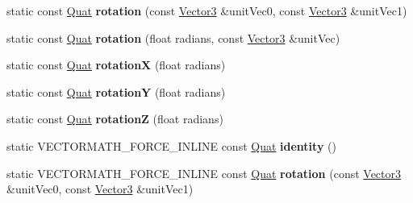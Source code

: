 \begin{DoxyCompactItemize}
\mbox{\label{classVectormath_1_1Aos_1_1Quat_ad4d8db2b4c7f290e92ab2d29e122f9a6}} 
static const \hyperlink{classVectormath_1_1Aos_1_1Quat}{Quat} {\bfseries rotation} (const \hyperlink{classVectormath_1_1Aos_1_1Vector3}{Vector3} \&unit\+Vec0, const \hyperlink{classVectormath_1_1Aos_1_1Vector3}{Vector3} \&unit\+Vec1)
\item 
\mbox{\label{classVectormath_1_1Aos_1_1Quat_a9e5f2d1f8fcce1ad4b74ec55ea872ec3}} 
static const \hyperlink{classVectormath_1_1Aos_1_1Quat}{Quat} {\bfseries rotation} (float radians, const \hyperlink{classVectormath_1_1Aos_1_1Vector3}{Vector3} \&unit\+Vec)
\item 
\mbox{\label{classVectormath_1_1Aos_1_1Quat_aacd4310a21602a1041c8d563e1e02781}} 
static const \hyperlink{classVectormath_1_1Aos_1_1Quat}{Quat} {\bfseries rotationX} (float radians)
\item 
\mbox{\label{classVectormath_1_1Aos_1_1Quat_a74de33fd4592ac97d102e9334bb6f29b}} 
static const \hyperlink{classVectormath_1_1Aos_1_1Quat}{Quat} {\bfseries rotationY} (float radians)
\item 
\mbox{\label{classVectormath_1_1Aos_1_1Quat_a7bc308b781629e197acb388b0e40a725}} 
static const \hyperlink{classVectormath_1_1Aos_1_1Quat}{Quat} {\bfseries rotationZ} (float radians)
\item 
\mbox{\label{classVectormath_1_1Aos_1_1Quat_a1d016bcafbde5c1cc3018d870740936c}} 
static V\+E\+C\+T\+O\+R\+M\+A\+T\+H\+\_\+\+F\+O\+R\+C\+E\+\_\+\+I\+N\+L\+I\+NE const \hyperlink{classVectormath_1_1Aos_1_1Quat}{Quat} {\bfseries identity} ()
\item 
\mbox{\label{classVectormath_1_1Aos_1_1Quat_a6cfb51e0a0d165f180c27f2a14c45267}} 
static V\+E\+C\+T\+O\+R\+M\+A\+T\+H\+\_\+\+F\+O\+R\+C\+E\+\_\+\+I\+N\+L\+I\+NE const \hyperlink{classVectormath_1_1Aos_1_1Quat}{Quat} {\bfseries rotation} (const \hyperlink{classVectormath_1_1Aos_1_1Vector3}{Vector3} \&unit\+Vec0, const \hyperlink{classVectormath_1_1Aos_1_1Vector3}{Vector3} \&unit\+Vec1)
\item 

\end{DoxyCompactItemize}
